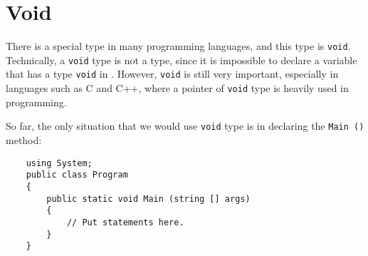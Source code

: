 \documentclass[../main.tex]{subfiles}
\begin{document}
    \section{Void}
    There is a special type in many programming languages, and this type is
    \texttt{void}. Technically, a \texttt{void} type is not a type, since it is
    impossible to declare a variable that has a type \texttt{void} in \csharp.
    However, \texttt{void} is still very important, especially in languages such
    as C and C++, where a pointer of \texttt{void} type is heavily used in programming.

    So far, the only situation that we would use \texttt{void} type is in
    declaring the \texttt{Main ()} method:
    \begin{verbatim}
    using System;
    public class Program
    {
        public static void Main (string [] args)
        {
            // Put statements here.
        }
    }
    \end{verbatim}
\end{document}
